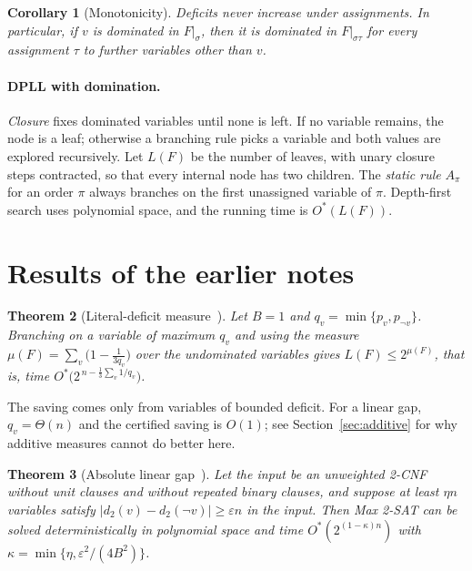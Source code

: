 \documentclass[11pt,a4paper]{article}
\newtheorem{theorem}{Theorem}
\newtheorem{corollary}[theorem]{Corollary}
\theoremstyle{remark}
\newcommand{\Ostar}{O^{*}}
\begin{document}
\begin{corollary}[Monotonicity]\label{cor:mono}
Deficits never increase under assignments. In particular, if $v$ is
dominated in $F|_\sigma$, then it is dominated in $F|_{\sigma\tau}$ for every
assignment $\tau$ to further variables other than $v$.
\end{corollary}

\paragraph{DPLL with domination.} \emph{Closure} fixes dominated variables
until none is left. If no variable remains, the node is a leaf; otherwise
a branching rule picks a variable and both values are explored recursively.
Let $L(F)$ be the number of leaves, with unary closure steps contracted, so
that every internal node has two children. The \emph{static rule}
$A_\pi$ for an order $\pi$ always branches on the first unassigned variable
of $\pi$. Depth-first search uses polynomial space, and the running time is
$\Ostar(L(F))$.

\section{Results of the earlier notes}

\begin{theorem}[Literal-deficit measure~\cite{N1}]\label{thm:n1}
Let $B=1$ and $q_v=\min\{p_v,p_{\neg v}\}$. Branching on a variable of maximum
$q_v$ and using the measure $\mu(F)=\sum_v\bigl(1-\tfrac1{3q_v}\bigr)$ over the
undominated variables gives $L(F)\le2^{\mu(F)}$, that is, time
$\Ostar\bigl(2^{\,n-\frac13\sum_v1/q_v}\bigr)$.
\end{theorem}

The saving comes only from variables of bounded deficit. For a linear gap,
$q_v=\Theta(n)$ and the certified saving is $O(1)$; see
Section~\ref{sec:additive} for why additive measures cannot do better here.

\begin{theorem}[Absolute linear gap~\cite{N2}]\label{thm:n2}
Let the input be an unweighted 2-CNF without unit clauses and without
repeated binary clauses, and suppose at least $\eta n$ variables satisfy
$|d_2(v)-d_2(\neg v)|\ge\varepsilon n$ in the input. Then Max 2-SAT can be
solved deterministically in polynomial space and time
$\Ostar(2^{(1-\kappa)n})$ with $\kappa=\min\{\eta,\varepsilon^2/(4B^2)\}$.
\end{theorem}
\end{document}
